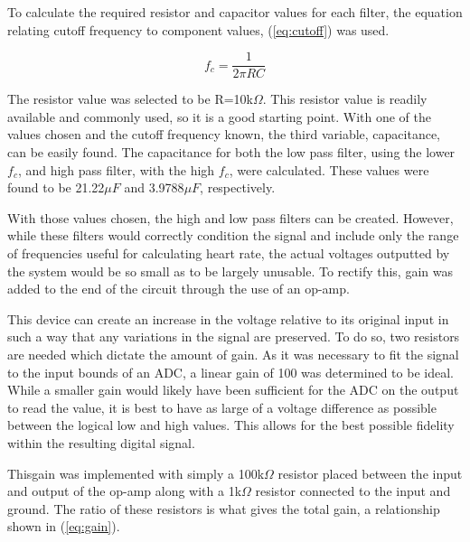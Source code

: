 \documentclass[conference]{IEEEtran}
\begin{document}
    To calculate the required resistor and capacitor values for each filter,
    the equation relating cutoff frequency to component values, (\ref{eq:cutoff}) was used.

    \begin{equation}
        f_c = \frac{1}{2 \pi RC}
        \label{eq:cutoff}
    \end{equation}
    
    The resistor value was selected to be R=10k$\Omega$. This
    resistor value is readily available and commonly used, so it is a good
    starting point. With one of the values chosen and the cutoff frequency
    known, the third variable, capacitance, can be easily found. The capacitance
    for both the low pass filter, using the lower $f_c$, and
    high pass filter, with the high $f_c$, were calculated. These values were
    found to be 21.22$\mu F$ and 3.9788$\mu F$, respectively.

    \begin{figure*}[h]
        \centering
        \texttt{[image: \{images/circuit\_sim.png]}}
        \caption{Complete Filtering Circuit}
        \label{fig:circuit_sim}
    \end{figure*}
    
    With those values chosen, the high and low pass filters can be created.
    However, while these filters would correctly condition the signal and
    include only the range of frequencies useful for calculating heart rate,
    the actual voltages outputted by the system would be so small as to be
    largely unusable. To rectify this, gain was added to the end of the circuit
    through the use of an op-amp.

    This device can create an increase in the voltage relative to its original
    input in such a way that any variations in the signal are preserved. To do
    so, two resistors are needed which dictate the amount of gain. As it was
    necessary to fit the signal to the input bounds of an ADC, a linear
    gain of 100 was determined to be ideal. While a smaller gain would likely have
    been sufficient for the ADC on the output to read the value, it is best to
    have as large of a voltage difference as possible between the logical low
    and high values. This allows for the best possible fidelity within the
    resulting digital signal.

    Thisgain was implemented with simply a 100k$\Omega$ resistor placed
    between the input and output of the op-amp along with a 1k$\Omega$ resistor
    connected to the input and ground. The ratio of these resistors is what
    gives the total gain, a relationship shown in (\ref{eq:gain}).
\end{document}
